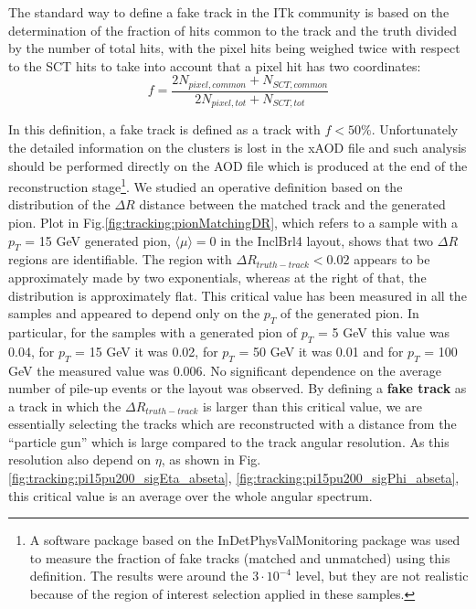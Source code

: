 \documentclass[a4paper,twoside,12pt]{book}
\begin{document}
The standard way to define a fake track in the ITk community is based on the determination of
 the fraction of hits common to the track and the truth divided by the number of total hits, with the pixel hits being weighed twice with respect to the SCT hits to take into account that a pixel hit has two coordinates: \\
$$
f = \frac{2N_{pixel, common} + N_{SCT, common}}{2N_{pixel, tot} + N_{SCT, tot}}
$$

In this definition, a fake track is defined as a track with $f < 50\%$. Unfortunately the detailed information on the clusters is lost in the xAOD file and such analysis should be performed directly on the AOD file
which is produced at the end of the reconstruction stage\footnote{A software package based on the InDetPhysValMonitoring package was used to measure the fraction of fake tracks (matched and unmatched) using this definition. The results were around the $3\cdot 10^{-4}$ level, but they are not realistic because of the region of interest selection applied in these samples.}. We studied an operative definition based on the distribution of the $\Delta R$ distance between the matched track and
the generated pion. Plot in Fig.\ref{fig:tracking:pionMatchingDR}, which refers to a sample with a $p_{T}$ = 15 GeV generated pion, $\langle\mu\rangle = 0$ in the InclBrl4 layout, shows 
that two $\Delta R$ regions are identifiable. The region with $\Delta R_{truth-track} < 0.02$ appears to be approximately made by two exponentials, whereas at the right of that, the distribution is approximately flat. This critical value has been measured in all the samples and appeared to depend only on the $p_{T}$ of the generated pion. In particular, for the samples with a generated pion of $p_{T}$ = 5 GeV this value was 0.04, for $p_{T}$ = 15 GeV it was 0.02, for $p_{T}$ = 50 GeV it was 0.01 and for $p_{T}$ = 100 GeV the measured value was 0.006. No significant dependence on the average number of pile-up events or the layout was observed. By defining
a \textbf{fake track} as a track in which the $\Delta R_{truth-track}$ is larger than this critical value, we are essentially selecting the tracks
which are reconstructed with a distance from the ``particle gun'' which is large compared to the track angular resolution. As this resolution also depend on $\eta$, as shown in Fig.
\ref{fig:tracking:pi15pu200_sigEta_abseta}, \ref{fig:tracking:pi15pu200_sigPhi_abseta}, this critical value is an average over the whole angular spectrum.\\
\end{document}
